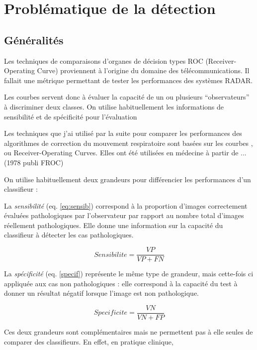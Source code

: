 \chapter{Problématique de la détection}
	\section{Généralités}

Les techniques de comparaisons d'organes de décision types ROC (Receiver-Operating Curve) proviennent à l'origine du domaine des télécommunications. Il fallait une métrique permettant de tester les performances des systèmes RADAR\cite{zou2007receiver}. 

Les courbes \ROC servent donc à évaluer la capacité de un ou plusieurs ``observateurs'' à discriminer deux classes. On utilise habituellement les informations de sensibilité et de spécificité pour l'évaluation

Les techniques que j'ai utilisé par la suite pour comparer les performances des algorithmes de correction du mouvement respiratoire sont basées sur les courbes \ROC, ou Receiver-Operating Curves. Elles ont été utilisées en médecine à partir de ... (1978 publi FROC)

On utilise habituellement deux grandeurs pour différencier les performances d'un classifieur :

La \emph{sensibilité} (eq. \ref{eq:sensib}) correspond à la proportion d'images correctement évaluées pathologiques par l'observateur par rapport au nombre total d'images réellement pathologiques. Elle donne une information sur la capacité du classifieur à détecter les cas pathologiques.

\begin{equation}
	\label{eq:sensib}
	Sensibilite = \frac{VP}{VP + FN}
\end{equation}

La \emph{spécificité} (eq. \ref{specif}) représente le même type de grandeur, mais cette-fois ci appliquée aux cas non pathologiques : elle correspond à la capacité du test à donner un résultat négatif lorsque l'image est non pathologique.

\begin{equation}
	\label{eq:specif}
	Specificite = \frac{VN}{VN + FP}
\end{equation}

Ces deux grandeurs sont complémentaires mais ne permettent pas à elle seules de comparer des classifieurs. En effet, en pratique clinique, 

